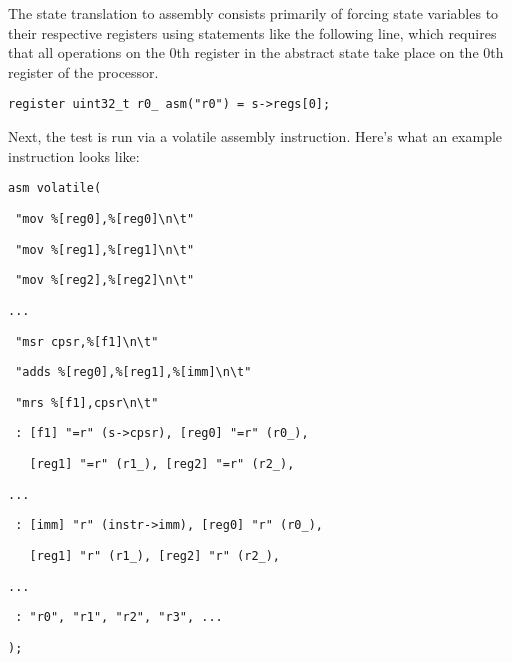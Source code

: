 \documentclass[letterpaper,12pt]{article}
\begin{document}
The state translation to assembly consists primarily of forcing state variables to their respective registers using statements like the following line, which requires that all operations on the 0th register in the abstract state take place on the 0th register of the processor.

\texttt{register uint32\_t r0\_ asm("r0") = s->regs[0];}

Next, the test is run via a volatile assembly instruction. Here's what an example instruction looks like:

\texttt{asm volatile(}

\texttt{\ "mov \%[reg0],\%[reg0]\textbackslash n\textbackslash t"}

\texttt{\ "mov \%[reg1],\%[reg1]\textbackslash n\textbackslash t"}

\texttt{\ "mov \%[reg2],\%[reg2]\textbackslash n\textbackslash t"}

\texttt{...}

\texttt{\ "msr cpsr,\%[f1]\textbackslash n\textbackslash t"}

\texttt{\ "adds \%[reg0],\%[reg1],\%[imm]\textbackslash n\textbackslash t"}

\texttt{\ "mrs \%[f1],cpsr\textbackslash n\textbackslash t"}
                
\texttt{\ : [f1] "=r" (s->cpsr), [reg0] "=r" (r0\_),}

\texttt{\ \ \ [reg1] "=r" (r1\_), [reg2] "=r" (r2\_),}

\texttt{...}

\texttt{\ : [imm] "r" (instr->imm), [reg0] "r" (r0\_),}

\texttt{\ \ \ [reg1] "r" (r1\_), [reg2] "r" (r2\_),}

\texttt{...}

\texttt{\ : "r0", "r1", "r2", "r3", ...}
            
\texttt{);}
\end{document}

